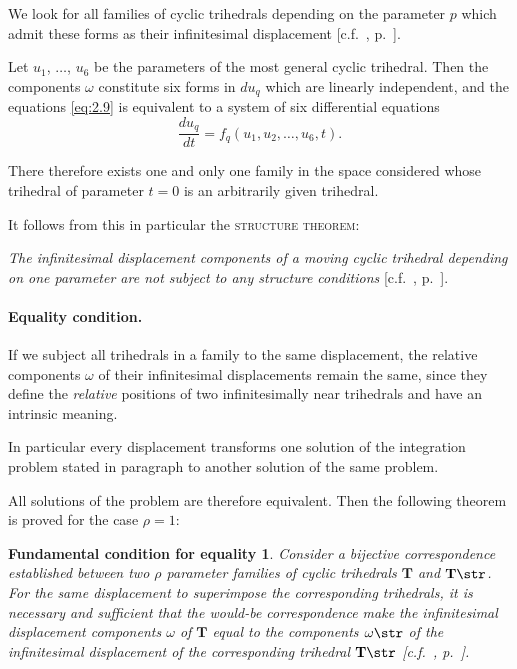 We look for all families of cyclic trihedrals depending on the parameter $p$ which admit these forms as their infinitesimal displacement [c.f.~, p.~\pageref{sec:5}].

Let $u_{1}$, $\dots$, $u_{6}$ be the parameters of the most general cyclic trihedral. Then the components $\omega$ constitute six forms in $du_{q}$ which are linearly independent, and the equations \eqref{eq:2.9} is equivalent to a system of six differential equations
\[
\frac{du_{q}}{dt}=f_{q}(u_{1},u_{2},\dots,u_{6},t).
\]

There therefore exists one and only one family in the space considered whose trihedral of parameter $t=0$ is an arbitrarily given trihedral.

It follows from this in particular the \textsc{structure theorem}:

\somespace

\emph{The infinitesimal displacement components of a moving cyclic trihedral depending on one parameter are not subject to any structure conditions} [c.f.~, p.~\pageref{sec:7}].

\paragraph{Equality condition.}
\label{sec:26}
If we subject all trihedrals in a family to the same displacement, the relative components $\omega$ of their infinitesimal displacements remain the same, since they define the \emph{relative} positions of two infinitesimally near trihedrals and have an intrinsic meaning.

In particular every displacement transforms one solution of the integration problem stated in paragraph  to another solution of the same problem.

All solutions of the problem are therefore equivalent. Then the following theorem is proved for the case $\rho=1$:

\newtheorem*{cfd26}{Fundamental condition for equality}
\begin{cfd26}
  Consider a bijective correspondence established between two $\rho$ parameter families of cyclic trihedrals $\mathbf{T}$ and $\mathbf{T}\str$. For the same displacement to superimpose the corresponding trihedrals, it is necessary and sufficient that the would-be correspondence make the infinitesimal displacement components $\omega$ of $\mathbf{T}$ equal to the components $\omega\str$ of the infinitesimal displacement of the corresponding trihedral $\mathbf{T}\str$ \emph{[c.f.~, p.~\pageref{sec:7}].}
\end{cfd26}

